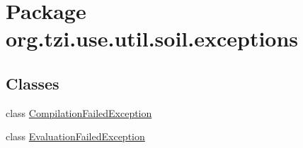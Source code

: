 \hypertarget{namespaceorg_1_1tzi_1_1use_1_1util_1_1soil_1_1exceptions}{\section{Package org.\-tzi.\-use.\-util.\-soil.\-exceptions}
\label{namespaceorg_1_1tzi_1_1use_1_1util_1_1soil_1_1exceptions}
}
\subsection*{Classes}
\begin{DoxyCompactItemize}
\item 
class \hyperlink{classorg_1_1tzi_1_1use_1_1util_1_1soil_1_1exceptions_1_1_compilation_failed_exception}{Compilation\-Failed\-Exception}
\item 
class \hyperlink{classorg_1_1tzi_1_1use_1_1util_1_1soil_1_1exceptions_1_1_evaluation_failed_exception}{Evaluation\-Failed\-Exception}
\end{DoxyCompactItemize}
